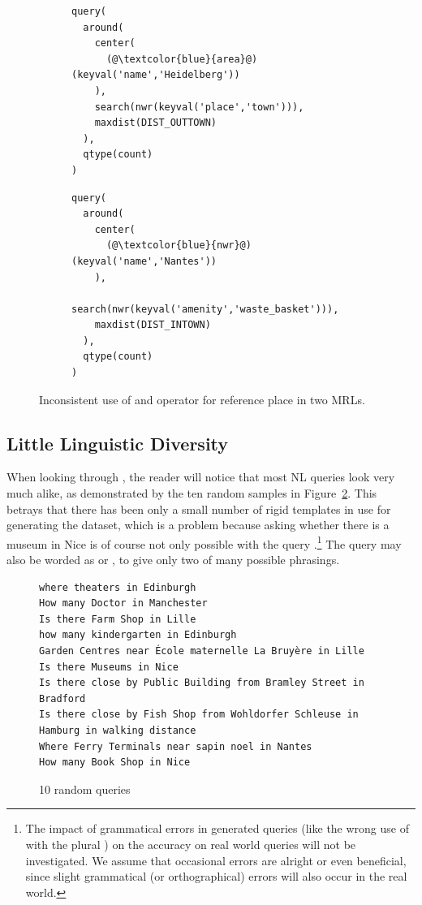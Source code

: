 \begin{figure}[h]
  \centering
  \begin{subfigure}{\textwidth}
    \begin{lstlisting}[style=MyMRL]
query(
  around(
    center(
      (@\textcolor{blue}{area}@)(keyval('name','Heidelberg'))
    ),
    search(nwr(keyval('place','town'))),
    maxdist(DIST_OUTTOWN)
  ),
  qtype(count)
)
    \end{lstlisting}
    \caption{}
  \end{subfigure}
  \begin{subfigure}{\textwidth}
    \begin{lstlisting}[style=MyMRL]
query(
  around(
    center(
      (@\textcolor{blue}{nwr}@)(keyval('name','Nantes'))
    ),
    search(nwr(keyval('amenity','waste_basket'))),
    maxdist(DIST_INTOWN)
  ),
  qtype(count)
)
    \end{lstlisting}
    \caption{}
  \end{subfigure}
  \caption{Inconsistent use of  and  operator for reference
    place in two MRLs.}
  \label{fig:around-with-one}
\end{figure}

\subsection{Little Linguistic Diversity}
\label{sec:little-linguistic-diversity}

When looking through \nlmapstwo{}, the reader will notice that most NL queries
look very much alike, as demonstrated by the ten random samples in
Figure~\ref{fig:nlmaps-v2-sample}. This betrays that there has been only a small
number of rigid templates in use for generating the dataset, which is a problem
because asking whether there is a museum in Nice is of course not only possible
with the query .\footnote{The impact of grammatical
  errors in generated queries (like the wrong use of  with the
  plural ) on the accuracy on real world queries will not be
  investigated. We assume that occasional errors are alright or even beneficial,
  since slight grammatical (or orthographical) errors will also occur in the
  real world.} The query may also be worded as  or , to give only two of many possible
phrasings.

\begin{figure}[h]
  \centering
  \begin{lstlisting}[style=MyNL]
where theaters in Edinburgh
How many Doctor in Manchester
Is there Farm Shop in Lille
how many kindergarten in Edinburgh
Garden Centres near École maternelle La Bruyère in Lille
Is there Museums in Nice
Is there close by Public Building from Bramley Street in Bradford
Is there close by Fish Shop from Wohldorfer Schleuse in Hamburg in walking distance
Where Ferry Terminals near sapin noel in Nantes
How many Book Shop in Nice
  \end{lstlisting}
  \caption{10 random \nlmapstwo{} queries}
  \label{fig:nlmaps-v2-sample}
\end{figure}


